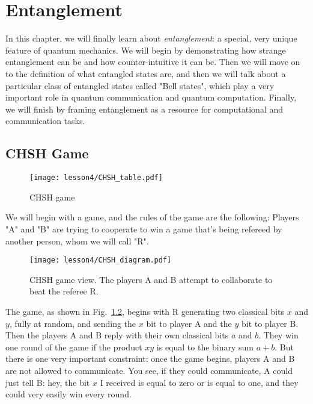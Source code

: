 \chapter{Entanglement}
\label{sec:4_entanglement}

In this chapter, we will finally learn about \emph{entanglement}: a special, very unique feature of quantum mechanics. We will begin by demonstrating how strange entanglement can be and how counter-intuitive it can be. Then we will move on to the definition of what entangled states are, and then we will talk about a particular class of entangled states called "Bell states", which play a very important role in quantum communication and quantum computation. Finally, we will finish by framing entanglement as a resource for computational and communication tasks.


\section{CHSH Game}
\label{sec:chsh-game}

\begin{figure}[H]
    \centering
    \texttt{[image: lesson4/CHSH\_table.pdf]}
    \label{fig: 1}
    
        \caption{CHSH game}
    
\end{figure}
\fi




We will begin with a game, and the rules of the game are the following: Players "A" and "B" are trying to cooperate to win a game that's being refereed by another person, whom we will call "R".

\begin{figure}[H]
    \centering
    \texttt{[image: lesson4/CHSH\_diagram.pdf]}
        \caption[CHSH game view]{CHSH game view. The players A and B attempt to collaborate to beat the referee R.}
    \label{fig:chsh-game}
\end{figure}

The game, as shown in Fig.~\ref{fig:chsh-game}, begins with R generating two classical bits $x$ and $y$, fully at random, and sending the $x$ bit to player A and the $y$ bit to player B. Then the players A and B reply with their own classical bits $a$ and $b$. They win one round of the game if the product $xy$ is equal to the binary sum $a + b$. But there is one very important constraint: once the game begins, players A and B are not allowed to communicate. You see, if they could communicate, A could just tell B: hey, the bit $x$ I received is equal to zero or is equal to one, and they could very easily win every round.

